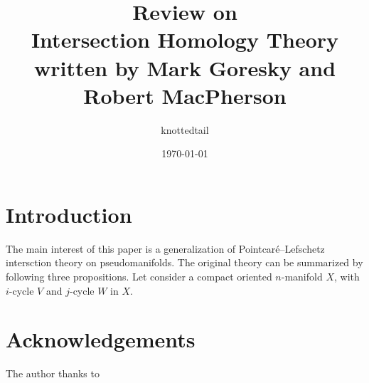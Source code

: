 \documentclass[11pt]{amsart}
\title{Review on \\ Intersection Homology Theory \\ \tiny{written by Mark Goresky and Robert MacPherson}}
\author{knottedtail}
\date{\today}
\begin{document}
\maketitle

\section*{Introduction}

The main interest of this paper is a generalization of Pointcar\'e--Lefschetz intersction theory on pseudomanifolds.
The original theory can be summarized by following three propositions.
Let consider a compact oriented $n$-manifold $X$, with $i$-cycle $V$ and $j$-cycle $W$ in $X$.



\section*{Acknowledgements}
The author thanks to 



\end{document}
